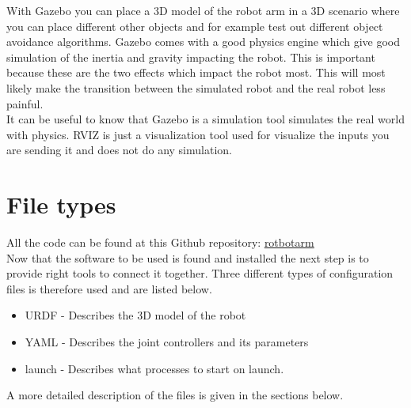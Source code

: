 With Gazebo you can place a 3D model of the robot arm in a 3D scenario where you can place different other objects and for example test out different object avoidance algorithms. Gazebo comes with a good physics engine which give good simulation of the inertia and gravity impacting the robot. This is important because these are the two effects which impact the robot most. This will most likely make the transition between the simulated robot and the real robot less painful. \\

It can be useful to know that Gazebo is a simulation tool simulates the real world with physics. RVIZ is just a visualization tool used for visualize the inputs you are sending it and does not do any simulation. 









\section{File types}
All the code can be found at this Github repository: \href{https://github.com/Aarskog/robotarm}{\underline{rotbotarm}}\\

Now that the software to be used is found and installed the next step is to provide right tools to connect it together. Three different types of configuration files is therefore used and are listed below.
\begin{itemize}
    \item URDF - Describes the 3D model of the robot
    \item YAML - Describes the joint controllers and its parameters
    \item launch - Describes what processes to start on launch.
\end{itemize}
A more detailed description of the files is given in the sections below. 

